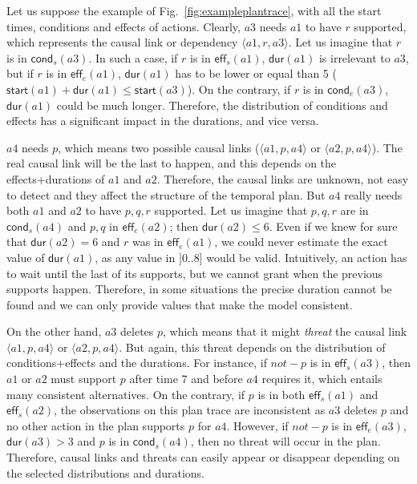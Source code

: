 \documentclass[runningheads]{llncs}
\newcommand{\tup}[1]{{\langle #1 \rangle}}
\newcommand{\eff}{\mathsf{eff}}    %
\newcommand{\cond}{\mathsf{cond}}  %
\newcommand{\dur}{\mathsf{dur}}    %
\newcommand{\start}{\mathsf{start}}%
\begin{document}
Let us suppose the example of Fig.~\ref{fig:exampleplantrace}, with all the start times, conditions and effects of actions. Clearly, $a3$ needs $a1$ to have $r$ supported, which represents the causal link or dependency $\tup{a1,r,a3}$. Let us imagine that $r$ is in $\cond_s(a3)$. In such a case, if $r$ is in $\eff_s(a1)$, $\dur(a1)$ is irrelevant to $a3$, but if $r$ is in $\eff_e(a1)$, $\dur(a1)$ has to be lower or equal than 5 ($\start(a1)+\dur(a1) \leq \start(a3)$). On the contrary, if $r$ is in $\cond_e(a3)$, $\dur(a1)$ could be much longer. Therefore, the distribution of conditions and effects has a significant impact in the durations, and vice versa.

$a4$ needs $p$, which means two possible causal links ($\tup{a1,p,a4}$ or $\tup{a2,p,a4}$). The real causal link will be the last to happen, and this depends on the effects+durations of $a1$ and $a2$. Therefore, the causal links are unknown, not easy to detect and they affect the structure of the temporal plan. But $a4$ really needs both $a1$ and $a2$ to have $p,q,r$ supported. Let us imagine that $p,q,r$ are in $\cond_s(a4)$ and $p,q$ in $\eff_e(a2)$; then $\dur(a2) \leq 6$. Even if we knew for sure that $\dur(a2)=6$ and $r$ was in $\eff_e(a1)$, we could never estimate the exact value of $\dur(a1)$, as any value in $]0..8]$ would be valid. Intuitively, an action has to wait until the last of its supports, but we cannot grant when the previous supports happen.%
Therefore, in some situations the precise duration cannot be found and we can only provide values that make the model consistent.

On the other hand, $a3$ deletes $p$, which means that it might \emph{threat} the causal link $\tup{a1,p,a4}$ or $\tup{a2,p,a4}$. But again, this threat depends on the distribution of conditions+effects and the durations. For instance, if $not-p$ is in $\eff_s(a3)$, then $a1$ or $a2$ must support $p$ after time 7 and before $a4$ requires it, which entails many consistent alternatives. On the contrary, if $p$ is in both $\eff_s(a1)$ and $\eff_s(a2)$, the observations on this plan trace are inconsistent as $a3$ deletes $p$ and no other action in the plan supports $p$ for $a4$. However, if $not-p$ is in $\eff_e(a3)$, $\dur(a3) > 3$ and $p$ is in $\cond_s(a4)$, then no threat will occur in the plan. Therefore, causal links and threats can easily appear or disappear depending on the selected distributions and durations.
\end{document}
